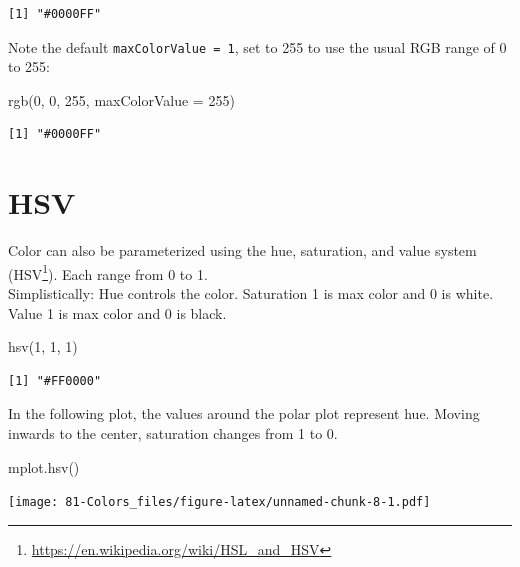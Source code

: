 \documentclass[
]{book}
\newenvironment{Shaded}{\begin{snugshade}}{\end{snugshade}}
\newcommand{\AttributeTok}[1]{\textcolor[rgb]{0.77,0.63,0.00}{#1}}
\newcommand{\DecValTok}[1]{\textcolor[rgb]{0.00,0.00,0.81}{#1}}
\newcommand{\FunctionTok}[1]{\textcolor[rgb]{0.00,0.00,0.00}{#1}}
\newcommand{\NormalTok}[1]{#1}
\DeclareRobustCommand{\href}[2]{#2\footnote{\url{#1}}}
\begin{document}
\begin{verbatim}
[1] "#0000FF"
\end{verbatim}

Note the default \texttt{maxColorValue\ =\ 1}, set to 255 to use the usual RGB range of 0 to 255:

\begin{Shaded}
\begin{Highlighting}[]
\FunctionTok{rgb}\NormalTok{(}\DecValTok{0}\NormalTok{, }\DecValTok{0}\NormalTok{, }\DecValTok{255}\NormalTok{, }\AttributeTok{maxColorValue =} \DecValTok{255}\NormalTok{)}
\end{Highlighting}
\end{Shaded}

\begin{verbatim}
[1] "#0000FF"
\end{verbatim}

\hypertarget{hsv}{%
\section{HSV}\label{hsv}}

Color can also be parameterized using the hue, saturation, and value system (\href{https://en.wikipedia.org/wiki/HSL_and_HSV}{HSV}). Each range from 0 to 1.\\
Simplistically: Hue controls the color. Saturation 1 is max color and 0 is white. Value 1 is max color and 0 is black.

\begin{Shaded}
\begin{Highlighting}[]
\FunctionTok{hsv}\NormalTok{(}\DecValTok{1}\NormalTok{, }\DecValTok{1}\NormalTok{, }\DecValTok{1}\NormalTok{)}
\end{Highlighting}
\end{Shaded}

\begin{verbatim}
[1] "#FF0000"
\end{verbatim}

In the following plot, the values around the polar plot represent hue. Moving inwards to the center, saturation changes from 1 to 0.

\begin{Shaded}
\begin{Highlighting}[]
\FunctionTok{mplot.hsv}\NormalTok{()}
\end{Highlighting}
\end{Shaded}

\texttt{[image: 81-Colors\_files/figure-latex/unnamed-chunk-8-1.pdf]}
\end{document}
